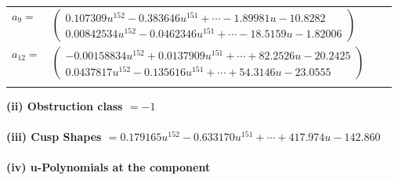 \documentclass[1p]{elsarticle_modified}
\theoremstyle{definition}
\begin{document}
\begin{tabular}{m{7pt} m{180pt} m{7pt} m{180pt} }
\flushright $a_{9}=$&$\begin{pmatrix}0.107309 u^{152}-0.383646 u^{151}+\cdots-1.89981 u-10.8282\\0.00842534 u^{152}-0.0462346 u^{151}+\cdots-18.5159 u-1.82006\end{pmatrix}$ \\
\flushright $a_{12}=$&$\begin{pmatrix}-0.00158834 u^{152}+0.0137909 u^{151}+\cdots+82.2526 u-20.2425\\0.0437817 u^{152}-0.135616 u^{151}+\cdots+54.3146 u-23.0555\end{pmatrix}$\\&\end{tabular}
\flushleft \textbf{(ii) Obstruction class $= -1$}\\~\\
\flushleft \textbf{(iii) Cusp Shapes $= 0.179165 u^{152}-0.633170 u^{151}+\cdots+417.974 u-142.860$}\\~\\
\newpage\renewcommand{\arraystretch}{1}
\flushleft \textbf{(iv) u-Polynomials at the component}\newline \\
\end{document}

